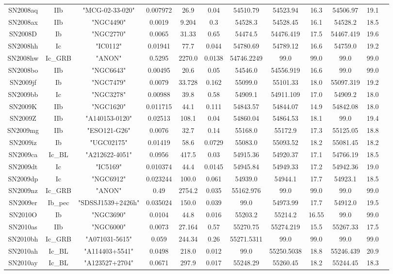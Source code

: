 \begin{table*}
\begin{tabular}{cccccccccccc}
SN2008aq&IIb&"MCG-02-33-020"&0.007972&26.9&0.04&54510.79&54523.94&16.3&54506.97&19.1\\ 
SN2008ax&IIb&"NGC4490"&0.0019&9.204&0.3&54528.3&54528.45&16.1&54528.2&18.5\\ 
SN2008D&Ib&"NGC2770"&0.0065&31.33&0.65&54474.5&54476.419&17.5&54467.419&19.6\\ 
SN2008hh&Ic&"IC0112"&0.01941&77.7&0.044&54780.69&54789.12&16.6&54759.0&19.2\\ 
SN2008hw&Ic_GRB&"ANON"&0.5295&2270.0&0.0138&54746.2249&99.0&99.0&99.0&99.0\\ 
SN2008bo&IIb&"NGC6643"&0.00495&20.6&0.05&54546.0&54556.919&16.6&99.0&99.0\\ 
SN2009jf&Ib&"NGC7479"&0.0079&33.728&0.162&55099.0&55101.33&18.0&55097.319&19.2\\ 
SN2009bb&Ic&"NGC3278"&0.00988&39.8&0.58&54909.1&54911.109&17.0&54909.2&18.0\\ 
SN2009K&IIb&"NGC1620"&0.011715&44.1&0.111&54843.57&54844.07&14.9&54842.08&18.0\\ 
SN2009Z&IIb&"A140153-0120"&0.02513&108.1&0.04&54860.04&54864.53&18.1&99.0&19.4\\ 
SN2009mg&IIb&"ESO121-G26"&0.0076&32.7&0.14&55168.0&55172.9&17.3&55125.05&18.8\\ 
SN2009iz&Ib&"UGC02175"&0.01419&58.6&0.0729&55083.0&55093.52&18.2&55081.45&18.2\\ 
SN2009ca&Ic_BL&"A212622-4051"&0.0956&417.5&0.03&54915.36&54920.37&17.1&54766.19&18.5\\ 
SN2009dt&Ic&"IC5169"&0.010374&44.4&0.0145&54945.84&54949.33&17.2&54942.36&19.0\\ 
SN2009dp&Ic&"NGC6912"&0.023244&100.0&0.061&54939.0&54944.1&17.7&54923.1&18.5\\ 
SN2009nz&Ic_GRB&"ANON"&0.49&2754.2&0.035&55162.976&99.0&99.0&99.0&99.0\\ 
SN2009er&Ib_pec&"SDSSJ1539+2426h"&0.035024&150.0&0.039&99.0&54973.99&17.7&54912.0&19.5\\ 
SN2010O&Ib&"NGC3690"&0.0104&44.8&0.016&55203.2&55214.2&16.55&99.0&99.0\\ 
SN2010as&IIb&"NGC6000"&0.0073&27.164&0.57&55270.75&55274.219&15.5&55267.33&17.5\\ 
SN2010bh&Ic_GRB&"A071031-5615"&0.059&244.34&0.26&55271.5311&99.0&99.0&99.0&99.0\\ 
SN2010ah&Ic_BL&"A114403+5541"&0.0498&218.0&0.012&99.0&55250.5038&18.8&55246.439&20.9\\ 
SN2010ay&Ic_BL&"A123527+2704"&0.0671&297.9&0.017&55248.29&55260.45&18.2&55244.45&18.3\\ 

\end{tabular}
\end{table*}
